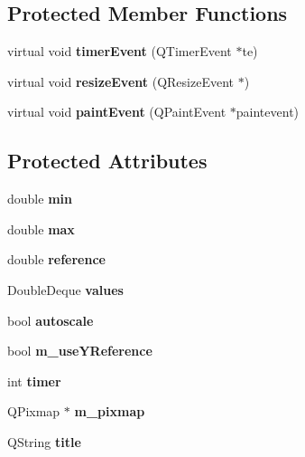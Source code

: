\subsection*{Protected Member Functions}
\begin{DoxyCompactItemize}
\item 
\mbox{\label{classQGraphPainter_a4c7e963731cd62a808b8c092cecbd09b}} 
virtual void {\bfseries timer\+Event} (Q\+Timer\+Event $\ast$te)
\item 
\mbox{\label{classQGraphPainter_adbe4afa15c5a653d7820f5004882b565}} 
virtual void {\bfseries resize\+Event} (Q\+Resize\+Event $\ast$)
\item 
\mbox{\label{classQGraphPainter_aa873f55313fe40673b529803891dfd14}} 
virtual void {\bfseries paint\+Event} (Q\+Paint\+Event $\ast$paintevent)
\end{DoxyCompactItemize}
\subsection*{Protected Attributes}
\begin{DoxyCompactItemize}
\item 
\mbox{\label{classQGraphPainter_aefe0fcaddc8416e303555f9b0adfcb44}} 
double {\bfseries min}
\item 
\mbox{\label{classQGraphPainter_a3b665bafcd49d1f612dfb1e9dfe630d9}} 
double {\bfseries max}
\item 
\mbox{\label{classQGraphPainter_a0feefecd1c1d290cf76009b3f662285f}} 
double {\bfseries reference}
\item 
\mbox{\label{classQGraphPainter_afcb6fb18a1119403dda4de3446edfb02}} 
Double\+Deque {\bfseries values}
\item 
\mbox{\label{classQGraphPainter_a57cbb3af42819d61e8ddaba6ecb3abc1}} 
bool {\bfseries autoscale}
\item 
\mbox{\label{classQGraphPainter_a0067f6212186a1a9f6668d3e8a0ca96b}} 
bool {\bfseries m\+\_\+use\+Y\+Reference}
\item 
\mbox{\label{classQGraphPainter_a1bad9ad62dde873d37a8b0dd47c358a3}} 
int {\bfseries timer}
\item 
\mbox{\label{classQGraphPainter_adf303f77d70ace6c0caedaee198221b7}} 
Q\+Pixmap $\ast$ {\bfseries m\+\_\+pixmap}
\item 
\mbox{\label{classQGraphPainter_ad4a46f35dc7b1cc9fbc0dff2188120b5}} 
Q\+String {\bfseries title}
\end{DoxyCompactItemize}


